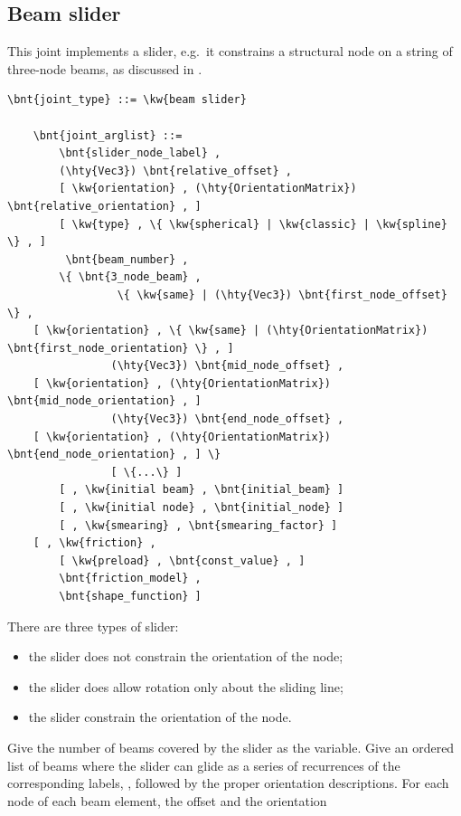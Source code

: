 \subsection{Beam slider}
This joint implements a slider, e.g.\ it constrains a structural node 
on a string of three-node beams, as discussed in \cite{SLIDER-AIDAA-2003}.
\begin{Verbatim}[commandchars=\\\{\}]
    \bnt{joint_type} ::= \kw{beam slider}

    \bnt{joint_arglist} ::=
        \bnt{slider_node_label} ,
        (\hty{Vec3}) \bnt{relative_offset} ,
        [ \kw{orientation} , (\hty{OrientationMatrix}) \bnt{relative_orientation} , ]
        [ \kw{type} , \{ \kw{spherical} | \kw{classic} | \kw{spline} \} , ]
         \bnt{beam_number} ,
	    \{ \bnt{3_node_beam} ,
                 \{ \kw{same} | (\hty{Vec3}) \bnt{first_node_offset} \} ,
    [ \kw{orientation} , \{ \kw{same} | (\hty{OrientationMatrix}) \bnt{first_node_orientation} \} , ]
                (\hty{Vec3}) \bnt{mid_node_offset} ,
    [ \kw{orientation} , (\hty{OrientationMatrix}) \bnt{mid_node_orientation} , ]
                (\hty{Vec3}) \bnt{end_node_offset} ,
    [ \kw{orientation} , (\hty{OrientationMatrix}) \bnt{end_node_orientation} , ] \}
                [ \{...\} ]
        [ , \kw{initial beam} , \bnt{initial_beam} ]
        [ , \kw{initial node} , \bnt{initial_node} ]
        [ , \kw{smearing} , \bnt{smearing_factor} ]
    [ , \kw{friction} ,
        [ \kw{preload} , \bnt{const_value} , ]
        \bnt{friction_model} , 
        \bnt{shape_function} ]
\end{Verbatim}
There are three types of slider:
\begin{itemize}
	\item the  slider does not constrain
	the orientation of the node;
	\item the  slider does allow rotation
	only about the sliding line;
	\item the  slider constrain the orientation
	of the node.
\end{itemize}
Give the number of beams covered by the slider as the 
variable. Give an ordered list of beams where the slider can glide
as a series of  recurrences of the corresponding labels, 
, followed by the proper orientation descriptions.
For each node of each beam element, the offset and the orientation
